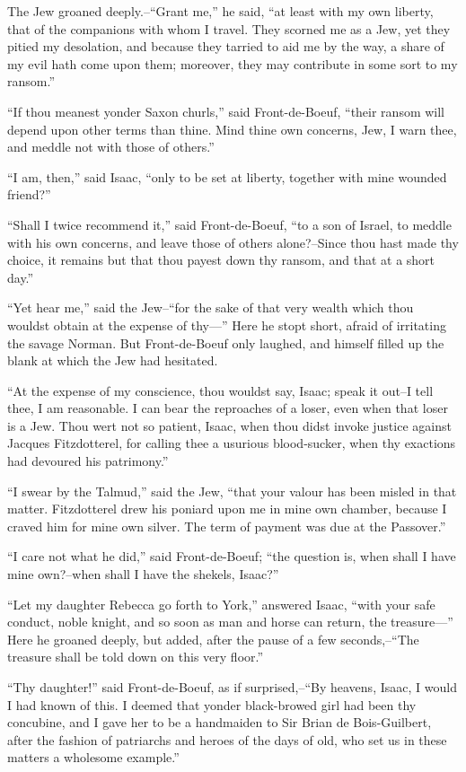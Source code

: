 The Jew groaned deeply.--``Grant me,'' he said, ``at least with my own
liberty, that of the companions with whom I travel. They scorned me as a
Jew, yet they pitied my desolation, and because they tarried to aid me
by the way, a share of my evil hath come upon them; moreover, they may
contribute in some sort to my ransom.''

``If thou meanest yonder Saxon churls,'' said Front-de-Boeuf, ``their
ransom will depend upon other terms than thine. Mind thine own concerns,
Jew, I warn thee, and meddle not with those of others.''

``I am, then,'' said Isaac, ``only to be set at liberty, together with
mine wounded friend?''

``Shall I twice recommend it,'' said Front-de-Boeuf, ``to a son of
Israel, to meddle with his own concerns, and leave those of others
alone?--Since thou hast made thy choice, it remains but that thou payest
down thy ransom, and that at a short day.''

``Yet hear me,'' said the Jew--``for the sake of that very wealth which
thou wouldst obtain at the expense of thy---'' Here he stopt short,
afraid of irritating the savage Norman. But Front-de-Boeuf only laughed,
and himself filled up the blank at which the Jew had hesitated.

``At the expense of my conscience, thou wouldst say, Isaac; speak it
out--I tell thee, I am reasonable. I can bear the reproaches of a loser,
even when that loser is a Jew. Thou wert not so patient, Isaac, when
thou didst invoke justice against Jacques Fitzdotterel, for calling thee
a usurious blood-sucker, when thy exactions had devoured his
patrimony.''

``I swear by the Talmud,'' said the Jew, ``that your valour has been
misled in that matter. Fitzdotterel drew his poniard upon me in mine own
chamber, because I craved him for mine own silver. The term of payment
was due at the Passover.''

``I care not what he did,'' said Front-de-Boeuf; ``the question is, when
shall I have mine own?--when shall I have the shekels, Isaac?''

``Let my daughter Rebecca go forth to York,'' answered Isaac, ``with
your safe conduct, noble knight, and so soon as man and horse can
return, the treasure---'' Here he groaned deeply, but added, after the
pause of a few seconds,--``The treasure shall be told down on this very
floor.''

``Thy daughter!'' said Front-de-Boeuf, as if surprised,--``By heavens,
Isaac, I would I had known of this. I deemed that yonder black-browed
girl had been thy concubine, and I gave her to be a handmaiden to Sir
Brian de Bois-Guilbert, after the fashion of patriarchs and heroes of
the days of old, who set us in these matters a wholesome example.''

